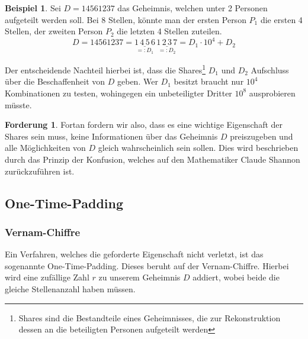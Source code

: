 \documentclass[12pt, a4paper, oneside, titlepage]{report}
\theoremstyle{definition}
\newtheorem{ford}[lemma]{Forderung}
\newtheorem{bsp}[lemma]{Beispiel}
\begin{document}
		\begin{bsp}
			Sei $ D = 14561237 $ das Geheimnis, welchen unter 2 Personen aufgeteilt werden soll. Bei 8 Stellen, könnte man der ersten Person $ P_1 $ die ersten 4 Stellen, der zweiten Person $ P_2 $ die letzten 4 Stellen zuteilen.
			$$ D = 14561237 = \underset{=:D_1}{\underline{1\,4\,5\,6}} \, \underset{=:D_2}{\underline{1\,2\,3\,7}} = D_1 \cdot 10^4 + D_2 $$
		\end{bsp}
		
		Der entscheidende Nachteil hierbei ist, dass die Shares\footnote{Shares sind die Bestandteile eines Geheimnisses, die zur Rekonstruktion dessen an die beteiligten Personen aufgeteilt werden} $ D_1 $ und $ D_2 $ Aufschluss über die Beschaffenheit von $ D $ geben. Wer $ D_1 $ besitzt braucht nur $ 10^4 $ Kombinationen zu testen, wohingegen ein unbeteiligter Dritter $ 10^8 $ ausprobieren müsste.
		\begin{ford}
			Fortan fordern wir also, dass es eine wichtige Eigenschaft der Shares sein muss, keine Informationen über das Geheimnis $ D $ preiszugeben und alle Möglichkeiten von $ D $ gleich wahrscheinlich sein sollen. Dies wird beschrieben durch das Prinzip der Konfusion, welches auf den Mathematiker Claude Shannon zurückzuführen ist.\cite{shannon}
		\end{ford}
		
	\subsection{One-Time-Padding}
	\subsubsection{Vernam-Chiffre}
		 Ein Verfahren, welches die geforderte Eigenschaft nicht verletzt, ist das sogenannte One-Time-Padding. Dieses beruht auf der Vernam-Chiffre. Hierbei wird eine zufällige Zahl $ r $ zu unserem Geheimnis $ D $  addiert, wobei beide die gleiche Stellenanzahl haben müssen. \cite{cobbe}
	
\end{document}
